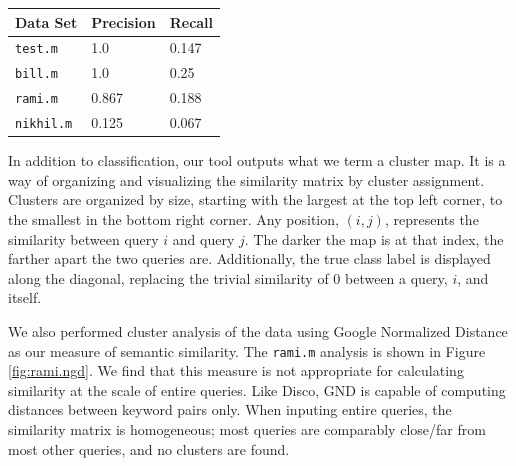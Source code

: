 \documentclass{llncs}
\begin{document}
\begin{multicols}{2}
\bigskip
\begin{centering}
    \begin{tabular}{ | l | l | l |}
    \hline
    {\bf Data Set} & {\bf Precision} & {\bf Recall} \\ \hline
    \texttt{test.m} & 1.0 & 0.147 \\ \hline
    \texttt{bill.m} & 1.0 & 0.25 \\ \hline
    \texttt{rami.m} & 0.867 & 0.188 \\ \hline
    \texttt{nikhil.m} & 0.125 & 0.067 \\ \hline
    \end{tabular}
\end{centering}
\bigskip

In addition to classification, our tool outputs what we term a cluster
map. It is a way of organizing and visualizing the similarity matrix
by cluster assignment. Clusters are organized by size, starting with
the largest at the top left corner, to the smallest in the bottom
right corner. Any position, $(i,j)$, represents the similarity between
query $i$ and query $j$. The darker the map is at that index, the
farther apart the two queries are. Additionally, the true class label
is displayed along the diagonal, replacing the trivial similarity of 0
between a query, $i$, and itself.

We also performed cluster analysis of the data using Google Normalized
Distance as our measure of semantic similarity. The \texttt{rami.m}
analysis is shown in Figure \ref{fig:rami.ngd}. We find that this
measure is not appropriate for calculating similarity at the scale of
entire queries. Like Disco, GND is capable of computing distances
between keyword pairs only. When inputing entire queries, the similarity
matrix is homogeneous; most queries are comparably close/far from most
other queries, and no clusters are found.


\end{multicols}
\end{document}
